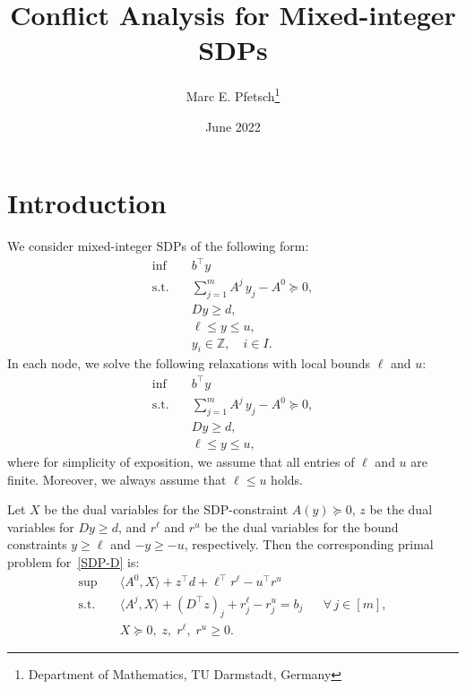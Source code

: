 \documentclass[10pt, a4paper]{article}
\title{Conflict Analysis for Mixed-integer SDPs}
\author{Marc E. Pfetsch\thanks{Department of Mathematics, TU Darmstadt, Germany}}
\date{June 2022}
\newcommand{\skal}[2]{\langle{#1},{#2}\rangle}
\newcommand{\T}{^{\top}}
\newcommand{\Z}{\mathds{Z}}
\begin{document}
\maketitle



\section{Introduction}

We consider mixed-integer SDPs of the following form:
\begin{equation}\label{MISDP}
  \begin{aligned}
    \inf \quad & b\T y \\
    \text{s.t.} \quad & \sum_{j=1}^m A^j\, y_j - A^0 \succeq 0, \\
    & D y \geq d,\\
    & \ell \leq y \leq u,\\
    & y_i \in \Z,\quad i \in I.
  \end{aligned}
\end{equation}
In each node, we solve the following relaxations with local bounds $\ell$
and $u$:
\begin{equation}\label{SDP-D}
  \begin{aligned}
    \inf \quad & b\T y \\
    \text{s.t.} \quad & \sum_{j=1}^m A^j\, y_j - A^0 \succeq 0, \\
    & D y \geq d,\\
    & \ell \leq y \leq u,
  \end{aligned}
\end{equation}
where for simplicity of exposition, we assume that all entries of $\ell$
and $u$ are finite. Moreover, we always assume that $\ell \leq u$ holds.

Let $X$ be the dual variables for the SDP-constraint $A(y) \succeq 0$, $z$
be the dual variables for $Dy \geq d$, and $r^\ell$ and $r^u$ be the dual
variables for the bound constraints $y \geq \ell$ and $-y \geq -u$,
respectively. Then the corresponding primal problem for~\eqref{SDP-D} is:
\begin{equation}\label{SDP-P}
  \begin{aligned}
     \sup \quad & \skal{A^0}{X} + z\T d + \ell\T r^\ell - u\T r^u\\
     \text{s.t.} \quad & \skal{A^j}{X} + (D\T z)_j + r^\ell_j - r^u_j = b_j && \forall \, j \in [m],\\
     & X \succeq 0,\; z, \; r^\ell,\; r^u \geq 0.
  \end{aligned}
\end{equation}
\end{document}
